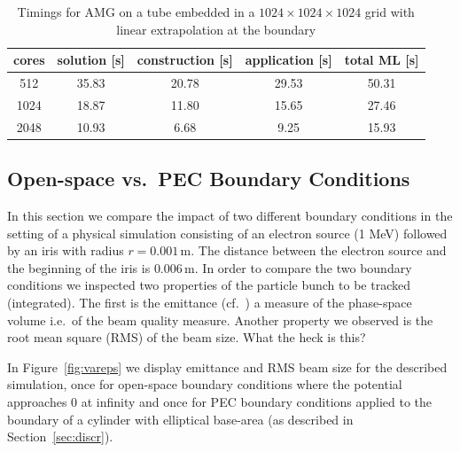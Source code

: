\begin{table}[htb]
  \begin{center}
    \begin{tabular}{ccccc}
      \hline
      cores & solution [s] & construction [s] & application [s] & total ML [s] \\
      \hline
      512  &  35.83 &  20.78 &  29.53 &  50.31  \\
      1024 &  18.87 &  11.80 &  15.65 &  27.46  \\
      2048 &  10.93 &  6.68 &  9.25 &  15.93   \\
      \hline
    \end{tabular}
    \caption{Timings for AMG on a tube embedded in a
      $1024\times1024\times1024$ grid with linear extrapolation at the
      boundary}
    \label{tbl:timings_solver_1024}
  \end{center}
\end{table}

\subsection{Open-space vs.\ PEC Boundary Conditions} 
\label{sec:physrun}

In this section we compare the impact of two different boundary
conditions in the setting of a physical simulation consisting of an
electron source (1 MeV) followed by an iris with radius $r = 0.001$\,m.
The distance between the electron source and the beginning of the iris
is $0.006$\,m.  In order to compare the two boundary conditions we
inspected two properties of the particle bunch to be tracked
(integrated).  The first is the emittance (cf.~\cite[pp.154ff]{wied:07})
a measure of the phase-space volume i.e.\ of the beam quality measure.
Another property we observed is the root mean square (RMS) of the beam
size.  {\color{red}What the heck is this?}

In Figure~\ref{fig:vareps} we display emittance and RMS beam size for
the described simulation, once for open-space boundary conditions where
the potential approaches 0 at infinity and once for PEC boundary
conditions applied to the boundary of a cylinder with elliptical
base-area (as described in Section~\ref{sec:discr}).


